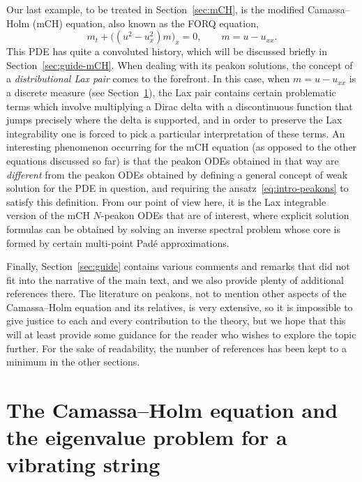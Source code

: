\documentclass[10pt,a4paper]{article} \pdfoutput=1 
\begin{document}
Our last example,
to be treated in Section~\ref{sec:mCH},
is the modified Camassa--Holm (mCH) equation,
also known as the FORQ equation,
\begin{equation}
  \label{eq:intro-mCH}
  m_t + \bigl( (u^2-u_x^2) m \bigr)_x = 0
  , \qquad
  m = u - u_{xx}
  .
\end{equation}
This PDE has quite a convoluted history, which
will be discussed briefly in Section~\ref{sec:guide-mCH}.
When dealing with its peakon solutions,
the concept of a \emph{distributional Lax pair}
comes to the forefront.
In this case, when $m=u-u_{xx}$ is a discrete measure (see Section~\ref{sec:CH}), the Lax pair
contains certain problematic terms which involve multiplying a Dirac delta with a discontinuous
function that jumps precisely where the delta is supported,
and in order to preserve the Lax integrability
one is forced to pick a particular interpretation of these terms.
An interesting phenomenon occurring for the mCH equation
(as opposed to the other equations discussed so far)
is that the peakon ODEs obtained in that way are \emph{different} from the peakon ODEs
obtained by defining a general concept of weak solution for the PDE in question,
and requiring the ansatz~\eqref{eq:intro-peakons} to satisfy this definition.
From our point of view here, it is the Lax integrable version of the mCH $N$-peakon ODEs
that are of interest, where explicit solution formulas can be obtained by solving an inverse
spectral problem whose core is formed by certain multi-point Padé approximations.

Finally, Section~\ref{sec:guide} contains various comments and remarks that did not fit
into the narrative of the main text, and we also provide plenty of additional references there.
The literature on peakons,
not to mention other aspects of the Camassa--Holm equation and its relatives,
is very extensive, so it is impossible to give
justice to each and every contribution to the theory,
but we hope that this will at least provide some guidance for the reader who wishes to explore the topic further.
For the sake of readability, the number of references has been kept to a minimum in the other sections.








\section{The Camassa--Holm equation and the eigenvalue problem for a vibrating string}
\label{sec:CH}
\end{document}
